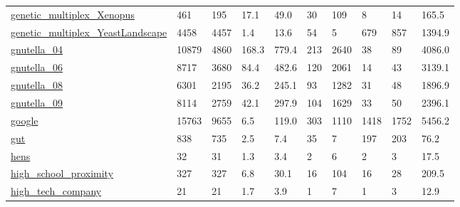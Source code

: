 \begin{longtable}{llllllllll}
 \href{https://manliodedomenico.com/data.php}{genetic\_multiplex\_Xenopus}                                                    & 461        & 195   & 17.1   & 49.0   & 30    & 109    & 8      & 14     & 165.5   \\
 \href{https://manliodedomenico.com/data.php}{genetic\_multiplex\_YeastLandscape}                                             & 4458       & 4457  & 1.4    & 13.6   & 54    & 5      & 679    & 857    & 1394.9  \\
 \href{http://snap.stanford.edu/data/p2p-Gnutella04.html}{gnutella\_04}                                                      & 10879      & 4860  & 168.3  & 779.4  & 213   & 2640   & 38     & 89     & 4086.0  \\
 \href{http://snap.stanford.edu/data/p2p-Gnutella04.html}{gnutella\_06}                                                      & 8717       & 3680  & 84.4   & 482.6  & 120   & 2061   & 14     & 43     & 3139.1  \\
 \href{http://snap.stanford.edu/data/p2p-Gnutella04.html}{gnutella\_08}                                                      & 6301       & 2195  & 36.2   & 245.1  & 93    & 1282   & 31     & 48     & 1896.9  \\
 \href{http://snap.stanford.edu/data/p2p-Gnutella04.html}{gnutella\_09}                                                      & 8114       & 2759  & 42.1   & 297.9  & 104   & 1629   & 33     & 50     & 2396.1  \\
 \href{http://konect.cc/networks/cfinder-google}{google}                                                                    & 15763      & 9655  & 6.5    & 119.0  & 303   & 1110   & 1418   & 1752   & 5456.2  \\
 \href{https://doi.org/10.1038/s41597-020-0516-5}{gut}                                                                      & 838        & 735   & 2.5    & 7.4    & 35    & 7      & 197    & 203    & 76.2    \\
 \href{http://konect.cc/networks/moreno_hens}{hens}                                                                         & 32         & 31    & 1.3    & 3.4    & 2     & 6      & 2      & 3      & 17.5    \\
 \href{www.sociopatterns.org/wp-content/uploads/2015/07/High-School_data_2013.csv.gz}{high\_school\_proximity}                & 327        & 327   & 6.8    & 30.1   & 16    & 104    & 16     & 28     & 209.5   \\
 \href{https://manliodedomenico.com/data.php}{high\_tech\_company}                                                            & 21         & 21    & 1.7    & 3.9    & 1     & 7      & 1      & 3      & 12.9    \\

\end{longtable}
